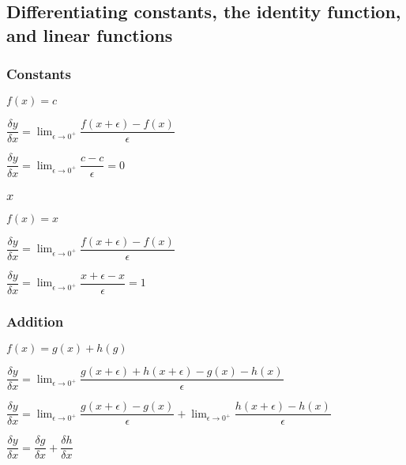 
\subsection{Differentiating constants, the identity function, and linear functions}

\subsubsection{Constants}

\(f(x)=c\)

\(\dfrac{\delta y}{\delta x}=\lim_{\epsilon \rightarrow 0^+}\dfrac{f(x+\epsilon )-f(x)}{\epsilon }\)

\(\dfrac{\delta y}{\delta x}=\lim_{\epsilon \rightarrow 0^+}\dfrac{c-c}{\epsilon }=0\)

\subsubsection{\(x\)}

\(f(x)=x\)

\(\dfrac{\delta y}{\delta x}=\lim_{\epsilon \rightarrow 0^+}\dfrac{f(x+\epsilon )-f(x)}{\epsilon }\)

\(\dfrac{\delta y}{\delta x}=\lim_{\epsilon \rightarrow 0^+}\dfrac{x+\epsilon -x}{\epsilon }=1\)

\subsubsection{Addition}

\(f(x)=g(x)+h(g)\)

\(\dfrac{\delta y}{\delta x}=\lim_{\epsilon \rightarrow 0^+}\dfrac{g(x+\epsilon )+h(x+\epsilon )-g(x)-h(x)}{\epsilon }\)

\(\dfrac{\delta y}{\delta x}=\lim_{\epsilon \rightarrow 0^+}\dfrac{g(x+\epsilon )-g(x)}{\epsilon }+\lim_{\epsilon \rightarrow 0^+}\dfrac{h(x+\epsilon )-h(x)}{\epsilon }\)

\(\dfrac{\delta y}{\delta x}=\dfrac{\delta g}{\delta x}+\dfrac{\delta h}{\delta x}\)

